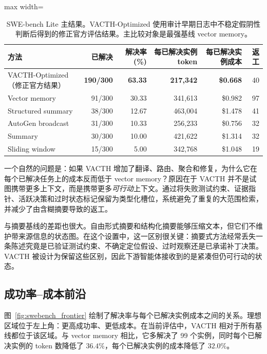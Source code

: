 \documentclass{article} %
\begin{document}
\begin{table}[t]
\centering
\small
\begin{adjustbox}{max width=\textwidth}
\begin{tabular}{lrrrrr}
\toprule
方法 & 已解决 & 解决率 (\%) & 每已解决实例 token & 每已解决实例成本 & 返工 \\
\midrule
VACTH-Optimized（修正官方结果） & \textbf{190/300} & \textbf{63.33} & \textbf{217{,}342} & \textbf{\$0.668} & 40 \\
Vector memory & 91/300 & 30.33 & 341{,}613 & \$0.982 & 97 \\
Structured summary & 38/300 & 12.67 & 463{,}004 & \$1.478 & 41 \\
AutoGen broadcast & 31/300 & 10.33 & 256{,}233 & \$0.756 & 32 \\
Summary & 30/300 & 10.00 & 421{,}622 & \$1.314 & 32 \\
Sliding window & 15/300 & 5.00 & 342{,}768 & \$1.048 & 19 \\
\bottomrule
\end{tabular}
\end{adjustbox}
\caption{SWE-bench Lite 主结果。VACTH-Optimized 使用审计早期日志中不稳定假阴性判断后得到的修正官方评估结果。主比较对象是最强基线 vector memory。}
\label{tab:swebench_main}
\end{table}

一个自然的问题是：如果 VACTH 增加了翻译、路由、聚合和修复，为什么它在每个已解决任务上的成本反而低于 vector memory？原因在于 VACTH 并不是试图携带更多上下文，而是携带更多\emph{可行动}上下文。通过将失败测试约束、证据指针、活跃决策和过时状态标记保留为类型化槽位，系统避免了重复的大范围检索，并减少了由含糊摘要导致的返工。

与摘要基线的差距也很大。自由形式摘要和结构化摘要能够压缩文本，但它们不维护带来源信息的状态图。在这个设置中，这一区别很关键：摘要式方法经常丢失一条陈述究竟是已验证测试约束、不确定定位假设、过时观察还是已承诺补丁决策。VACTH 被设计为保留这些区别，因此下游智能体接收到的是紧凑但仍可行动的状态。

\subsection{成功率--成本前沿}

图~\ref{fig:swebench_frontier} 绘制了解决率与每个已解决实例成本之间的关系。理想区域位于左上角：更高成功率、更低成本。在当前评估中，VACTH 相对于所有基线都位于该区域。与 vector memory 相比，它多解决了 99 个实例，同时每个已解决实例的 token 数降低了 $36.4\%$，每个已解决实例的成本降低了 $32.0\%$。
\end{document}
